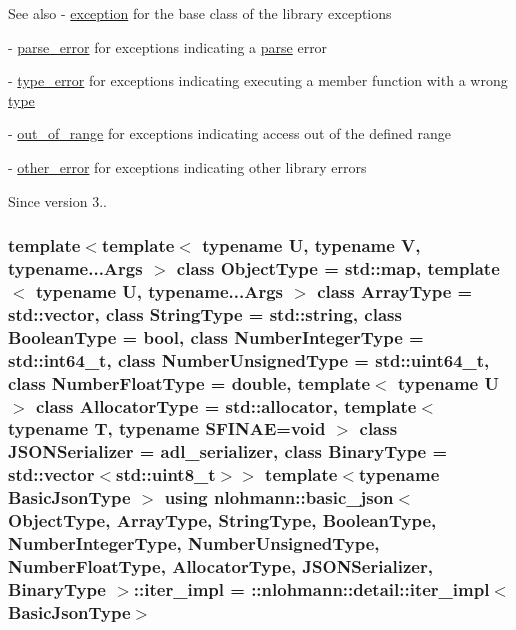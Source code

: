\begin{DoxySeeAlso}{See also}
-\/ \hyperlink{classnlohmann_1_1basic__json_a14824c27188d2fee4861806cd5f23d22}{exception} for the base class of the library exceptions 

-\/ \hyperlink{classnlohmann_1_1basic__json_a555b05e9da63d486126759922685a37a}{parse\+\_\+error} for exceptions indicating a \hyperlink{classnlohmann_1_1basic__json_a15018ade392a844ea32d5188d1a0b9c6}{parse} error 

-\/ \hyperlink{classnlohmann_1_1basic__json_ace5bf851eafe85bd6332f978991bc11c}{type\+\_\+error} for exceptions indicating executing a member function with a wrong \hyperlink{classnlohmann_1_1basic__json_a5b7c4b35a0ad9f97474912a08965d7ad}{type} 

-\/ \hyperlink{classnlohmann_1_1basic__json_a2251d8523fa6d16c0fba6388ffa2ef8c}{out\+\_\+of\+\_\+range} for exceptions indicating access out of the defined range 

-\/ \hyperlink{classnlohmann_1_1basic__json_a6fc373c99facc37aadbc5651b3d6631d}{other\+\_\+error} for exceptions indicating other library errors
\end{DoxySeeAlso}
\begin{DoxySince}{Since}
version 3.. 
\end{DoxySince}
\subsubsection[{\texorpdfstring{iter\+\_\+impl}{iter_impl}}]{\setlength{\rightskip}{0pt plus 5cm}template$<$template$<$ typename U, typename V, typename...\+Args $>$ class Object\+Type = std\+::map, template$<$ typename U, typename...\+Args $>$ class Array\+Type = std\+::vector, class String\+Type  = std\+::string, class Boolean\+Type  = bool, class Number\+Integer\+Type  = std\+::int64\+\_\+t, class Number\+Unsigned\+Type  = std\+::uint64\+\_\+t, class Number\+Float\+Type  = double, template$<$ typename U $>$ class Allocator\+Type = std\+::allocator, template$<$ typename T, typename S\+F\+I\+N\+A\+E=void $>$ class J\+S\+O\+N\+Serializer = adl\+\_\+serializer, class Binary\+Type  = std\+::vector$<$std\+::uint8\+\_\+t$>$$>$ template$<$typename Basic\+Json\+Type $>$ using {\bf nlohmann\+::basic\+\_\+json}$<$ Object\+Type, Array\+Type, String\+Type, Boolean\+Type, Number\+Integer\+Type, Number\+Unsigned\+Type, Number\+Float\+Type, Allocator\+Type, J\+S\+O\+N\+Serializer, Binary\+Type $>$\+::{\bf iter\+\_\+impl} =  \+::{\bf nlohmann\+::detail\+::iter\+\_\+impl}$<$Basic\+Json\+Type$>$\hspace{0.3cm}{\ttfamily [private]}}\hypertarget{classnlohmann_1_1basic__json_a7b03055088a8e9770680ee975fb8ba55}{}\label{classnlohmann_1_1basic__json_a7b03055088a8e9770680ee975fb8ba55}
